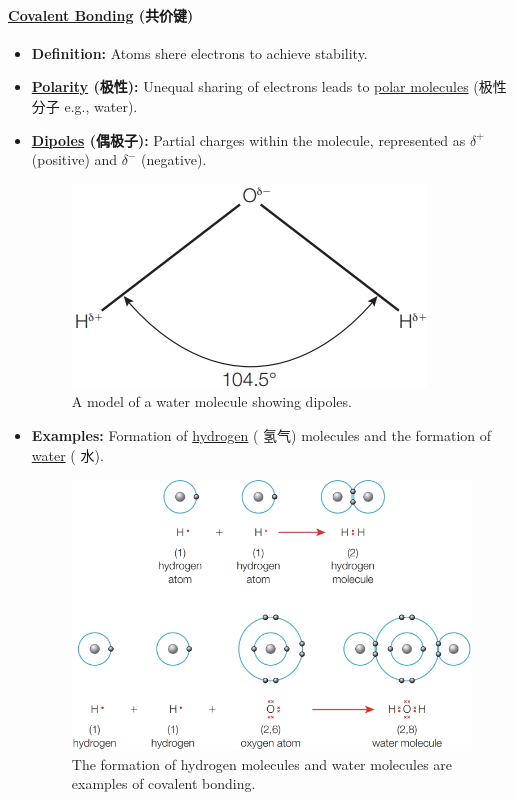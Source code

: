 \paragraph{\underline{Covalent Bonding} (共价键)}
\begin{itemize}
    \item \textbf{Definition:} Atoms shere electrons to achieve stability.
    \item \textbf{\underline{Polarity} (极性):} Unequal sharing of electrons leads to \underline{polar molecules} (极性分子 e.g.,
    water).
    \item \textbf{\underline{Dipoles} (偶极子):} Partial charges within the molecule, represented as $\delta^+$ (positive) and
    $\delta^-$ (negative).
    \begin{figure}[H]
        \centering
        \includegraphics[scale=0.35]{Biology/1A/Images/1A-1-3.png}
        \caption{A model of a water molecule showing dipoles.}
    \end{figure}
    \item \textbf{Examples:} Formation of \underline{hydrogen} ( 氢气) molecules and the formation of \underline{water}
    ( 水).
    \begin{figure}[H]
        \centering
        \includegraphics[scale=0.3]{Biology/1A/Images/1A-1-2.png}
        \caption{The formation of hydrogen molecules and water molecules are examples of covalent bonding.}
    \end{figure}
\end{itemize}

